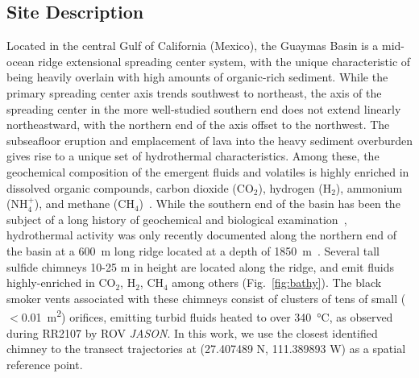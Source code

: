 \subsection{Site Description}
Located in the central Gulf of California (Mexico), the Guaymas Basin is a mid-ocean ridge extensional spreading center system, with the unique characteristic of being heavily overlain with high amounts of organic-rich sediment. While the primary spreading center axis trends southwest to northeast, the axis of the spreading center in the more well-studied southern end does not extend linearly northeastward, with the northern end of the axis offset to the northwest. The subseafloor eruption and emplacement of lava into the heavy sediment overburden gives rise to a unique set of hydrothermal characteristics. Among these, the geochemical composition of the emergent fluids and volatiles is highly enriched in dissolved organic compounds, carbon dioxide (CO$_2$), hydrogen (H$_2$), ammonium (NH$_{4}^{+}$), and methane (CH$_4$)~\autocite{seewald1994variations, von1985chemistry}. While the southern end of the basin has been the subject of a long history of geochemical and biological examination~\autocite{ondreas2018recent, teske2016guaymas, seewald1994variations, von1985chemistry, lonsdale1985hydrothermal}, hydrothermal activity was only recently documented along the northern end of the basin at a \SI{600}{\meter} long ridge located at a depth of \SI{1850}{\meter}~\autocite{soule2018exploration, geilert2018formation}. Several tall sulfide chimneys 10-25 m in height are located along the ridge, and emit fluids highly-enriched in CO$_2$, H$_2$, CH$_4$ among others (Fig.~\ref{fig:bathy}). The black smoker vents associated with these chimneys consist of clusters of tens of small ($<$\SI{0.01}{\meter\squared}) orifices, emitting turbid fluids heated to over \SI{340}{\celsius}, as observed during RR2107 by ROV \emph{JASON}. In this work, we use the closest identified chimney to the transect trajectories at (27.407489 N, 111.389893 W) as a spatial reference point.

